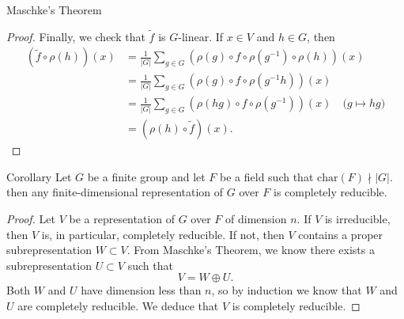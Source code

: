\begin{frame}{Maschke's Theorem}
\begin{proof}
 { Finally, we check that $\widetilde{f}$ is $G$-linear.  If $x \in V$ and $h \in G$, then
\begin{align*}
(\widetilde{f} \circ \rho(h))(x) &= \frac{1}{|G|} \sum_{g \in G} (\rho(g) \circ f \circ \rho(g^{-1}) \circ \rho(h))(x) \\
&= \frac{1}{|G|} \sum_{g \in G} (\rho(g) \circ f \circ \rho(g^{-1} h))(x) \\
&=\frac{1}{|G|} \sum_{g \in G} (\rho(hg) \circ f \circ \rho(g^{-1}))(x) \quad \text{(} g \mapsto hg \text{)} \\
&= (\rho(h) \circ \widetilde{f}) (x).
\end{align*}}
\end{proof}
\end{frame}

\begin{frame}
\begin{block}{Corollary}
Let $G$ be a finite group and let $F$ be a field such that $\text{char}(F) \nmid |G|$. then any finite-dimensional representation of $G$ over $F$ is completely reducible.
\end{block}
\begin{proof}
Let $V$ be a representation of $G$ over $F$ of dimension $n$.  If $V$ is irreducible, then $V$ is, in particular, completely reducible.  If not, then $V$ contains a proper subrepresentation $W \subset V$.  From Maschke's Theorem, we know there exists a subrepresentation $U \subset V$ such that 
\begin{equation}  V = W \oplus U. \end{equation}
Both $W$ and $U$ have dimension less than $n$, so by induction we know that $W$ and $U$ are completely reducible. We deduce that $V$ is completely reducible.
\end{proof}
\end{frame}

